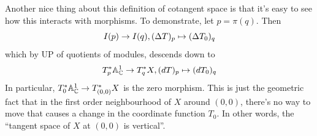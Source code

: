 \begin{eg}[Infinitesimals]
  Another nice thing about this definition of 
  cotangent space is that it's easy to see how this interacts with morphisms.
  To demonstrate, let $p = \pi(q)$. 
  Then \[
    I(p) \to I(q), (\Delta T)_p \mapsto (\Delta T_0)_q 
  \]
  which by UP of quotients of modules, 
  descends down to 
  \[
    T_p^* \mathbb{A}^1_{\mathbb{C}} \to T_q^* X, (dT)_p \mapsto (dT_0)_q
  \]
  In particular, $T_0^* \mathbb{A}^1_{\mathbb{C}} \to T_{(0,0)}^* X$ is the zero morphism. 
  This is just the geometric fact that 
  in the first order neighbourhood of $X$ around $(0,0)$, 
  there's no way to move that causes 
  a change in the coordinate function $T_0$.
  In other words, the ``tangent space of $X$ at $(0,0)$ is vertical''.


\end{eg}
